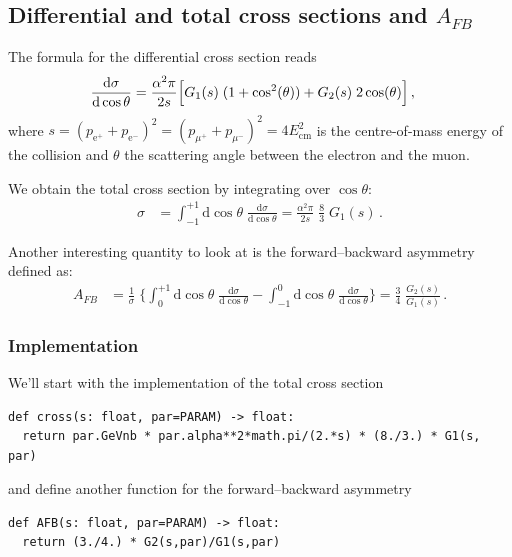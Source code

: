 \documentclass[11pt]{article}
\begin{document}
\subsection{Differential and total cross sections and \(A_{FB}\)}
\label{sec:org916b15a}
The formula for the differential cross section reads
\begin{align}
  \frac{\mathrm{d}\sigma}{\mathrm{d}\cos\theta}
  &=
  \frac{\alpha^2\pi}{2 s} \Bigl[ G_1(s)\; (1+\cos^2(\theta)) + G_2(s)\; 2 \cos(\theta) \Bigr]
  \,,
\end{align}
where \(s=(p_{\mathrm{e}^+}+p_{\mathrm{e}^-})^2=(p_{\mu^+}+p_{\mu^-})^2 = 4 E_\mathrm{cm}^2\) is the centre-of-mass energy of the collision and \(\theta\) the scattering angle between the electron and the muon.

We obtain the total cross section by integrating over \(\cos\theta\):
\begin{align}
  \sigma
  &=
  \int_{-1}^{+1}\mathrm{d}\cos\theta \; \frac{\mathrm{d}\sigma}{\mathrm{d}\cos\theta}
  = \frac{\alpha^2\pi}{2 s} \; \frac{8}{3} \; G_1(s)
  \,.
\end{align}

Another interesting quantity to look at is the forward--backward asymmetry defined as:
\begin{align}
  A_{FB}
  &=
  \frac{1}{\sigma}\;\biggl\{
  \int_{0}^{+1}\mathrm{d}\cos\theta \; \frac{\mathrm{d}\sigma}{\mathrm{d}\cos\theta} -
  \int_{-1}^{0}\mathrm{d}\cos\theta \; \frac{\mathrm{d}\sigma}{\mathrm{d}\cos\theta}
  \biggr\}
  = \frac{3}{4} \; \frac{G_2(s)}{G_1(s)}
  \,.
\end{align}


\subsubsection{Implementation}
\label{sec:org2237fb2}
We'll start with the implementation of the total cross section
\begin{verbatim}
def cross(s: float, par=PARAM) -> float:
  return par.GeVnb * par.alpha**2*math.pi/(2.*s) * (8./3.) * G1(s, par)
\end{verbatim}
and define another function for the forward--backward asymmetry
\begin{verbatim}
def AFB(s: float, par=PARAM) -> float:
  return (3./4.) * G2(s,par)/G1(s,par)
\end{verbatim}
\end{document}
